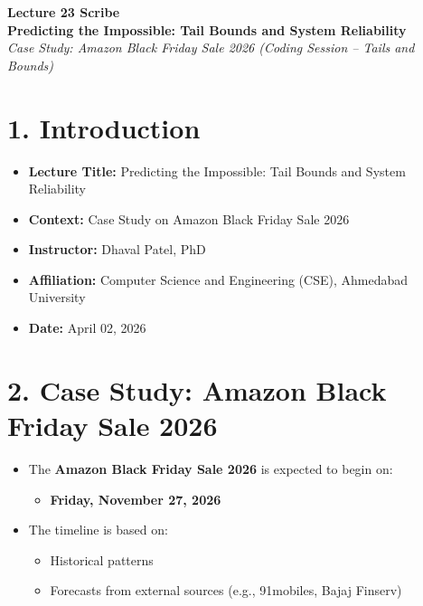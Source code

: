 \documentclass[12pt]{article}
\begin{document}
\begin{center}
    {\LARGE \textbf{Lecture 23 Scribe}}\\[0.3cm]
    {\large \textbf{Predicting the Impossible: Tail Bounds and System Reliability}}\\[0.2cm]
    {\normalsize \textit{Case Study: Amazon Black Friday Sale 2026 (Coding Session – Tails and Bounds)}}
\end{center}

\vspace{0.5cm}

\section*{1. Introduction}

\begin{itemize}
    \item \textbf{Lecture Title:} Predicting the Impossible: Tail Bounds and System Reliability  
    \item \textbf{Context:} Case Study on Amazon Black Friday Sale 2026  
    \item \textbf{Instructor:} Dhaval Patel, PhD  
    \item \textbf{Affiliation:} Computer Science and Engineering (CSE), Ahmedabad University  
    \item \textbf{Date:} April 02, 2026  
\end{itemize}

\section*{2. Case Study: Amazon Black Friday Sale 2026}

\begin{itemize}
    \item The \textbf{Amazon Black Friday Sale 2026} is expected to begin on:
    \begin{itemize}
        \item \textbf{Friday, November 27, 2026}
    \end{itemize}
    \item The timeline is based on:
    \begin{itemize}
        \item Historical patterns  
        \item Forecasts from external sources (e.g., 91mobiles, Bajaj Finserv)
    \end{itemize}
\end{itemize}
\end{document}
